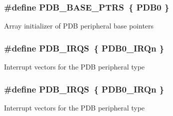 \subsubsection[{\texorpdfstring{P\+D\+B\+\_\+\+B\+A\+S\+E\+\_\+\+P\+T\+RS}{PDB_BASE_PTRS}}]{\setlength{\rightskip}{0pt plus 5cm}\#define P\+D\+B\+\_\+\+B\+A\+S\+E\+\_\+\+P\+T\+RS~\{ {\bf P\+D\+B0} \}}\hypertarget{group__PDB__Peripheral__Access__Layer_ga6dce940c99da63282b1d28f65ed75293}{}\label{group__PDB__Peripheral__Access__Layer_ga6dce940c99da63282b1d28f65ed75293}
Array initializer of P\+DB peripheral base pointers 
\subsubsection[{\texorpdfstring{P\+D\+B\+\_\+\+I\+R\+QS}{PDB_IRQS}}]{\setlength{\rightskip}{0pt plus 5cm}\#define P\+D\+B\+\_\+\+I\+R\+QS~\{ {\bf P\+D\+B0\+\_\+\+I\+R\+Qn} \}}\hypertarget{group__PDB__Peripheral__Access__Layer_ga8e897cb723b12765718d641d60409ce3}{}\label{group__PDB__Peripheral__Access__Layer_ga8e897cb723b12765718d641d60409ce3}
Interrupt vectors for the P\+DB peripheral type 
\subsubsection[{\texorpdfstring{P\+D\+B\+\_\+\+I\+R\+QS}{PDB_IRQS}}]{\setlength{\rightskip}{0pt plus 5cm}\#define P\+D\+B\+\_\+\+I\+R\+QS~\{ {\bf P\+D\+B0\+\_\+\+I\+R\+Qn} \}}\hypertarget{group__PDB__Peripheral__Access__Layer_ga8e897cb723b12765718d641d60409ce3}{}\label{group__PDB__Peripheral__Access__Layer_ga8e897cb723b12765718d641d60409ce3}
Interrupt vectors for the P\+DB peripheral type 